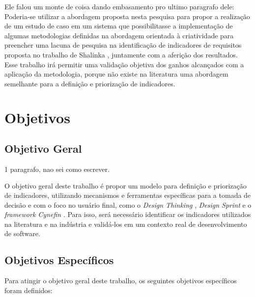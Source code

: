 Ele falou um monte de coisa dando embasamento pro ultimo paragrafo dele:
Poderia-se utilizar a abordagem proposta nesta pesquisa para propor a realização de um estudo de caso em um sistema que possibilitasse a implementação de algumas metodologias definidas na abordagem orientada à criatividade para preencher uma lacuna de pesquisa na identificação de indicadores de requisitos proposta no trabalho de Shalinka \cite{shalinka}, juntamente com a aferição dos resultados. Esse trabalho irá permitir uma validação objetiva dos ganhos alcançados com a aplicação da metodologia, porque não existe na literatura uma abordagem semelhante para a definição e priorização de indicadores.  

\section{Objetivos}%

\subsection{Objetivo Geral} 

1 paragrafo, nao sei como escrever. 

O objetivo geral deste trabalho é propor um modelo para definição e priorização de indicadores, utilizando mecanismos e ferramentas específicas para a tomada de decisão e com o foco no usuário final, como o \textit{Design Thinking} \cite{liedtka2018exploring}, \textit{Design Sprint} \cite{ferreira2019using} e o \textit{framework Cynefin} \cite{shalbafan2018decision}. Para isso, será necessário identificar os indicadores utilizados na literatura e na indústria e validá-los em um contexto real de desenvolvimento de software.

\subsection{Objetivos Específicos}
\label{obj}

Para atingir o objetivo geral deste trabalho,  os seguintes objetivos específicos foram definidos:

